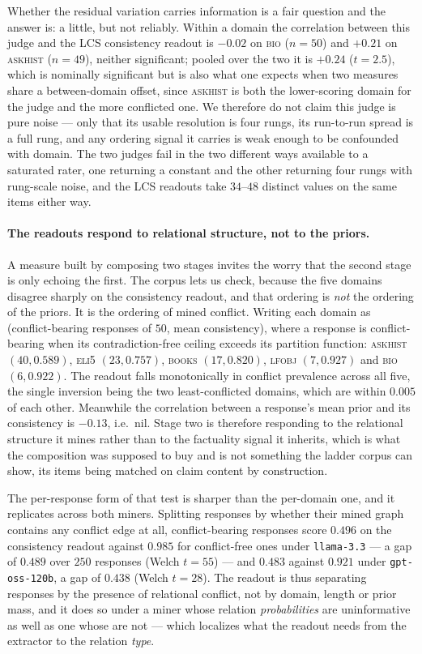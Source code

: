 Whether the residual variation carries information is a fair question and the answer is: a little, but
not reliably. Within a domain the correlation between this judge and the LCS consistency readout is
$-0.02$ on \textsc{bio} ($n = 50$) and $+0.21$ on \textsc{askhist} ($n = 49$), neither significant;
pooled over the two it is $+0.24$ ($t = 2.5$), which is nominally significant but is also what one
expects when two measures share a between-domain offset, since \textsc{askhist} is both the
lower-scoring domain for the judge and the more conflicted one. We therefore do not claim this judge is
pure noise --- only that its usable resolution is four rungs, its run-to-run spread is a full rung, and
any ordering signal it carries is weak enough to be confounded with domain. The two judges fail in the
two different ways available to a saturated rater, one returning a constant and the other returning
four rungs with rung-scale noise, and the LCS readouts take $34$--$48$ distinct values on the same items
either way.

\paragraph{The readouts respond to relational structure, not to the priors.} A measure built by
composing two stages invites the worry that the second stage is only echoing the first. The corpus lets
us check, because the five domains disagree sharply on the consistency readout, and that ordering is
\emph{not} the ordering of the priors. It is the ordering of mined conflict. Writing each domain as
(conflict-bearing responses of $50$, mean consistency), where a response is conflict-bearing when its
contradiction-free ceiling exceeds its partition function: \textsc{askhist} $(40, 0.589)$,
\textsc{eli5} $(23, 0.757)$, \textsc{books} $(17, 0.820)$, \textsc{lfobj} $(7, 0.927)$ and \textsc{bio}
$(6, 0.922)$. The readout falls monotonically in conflict prevalence across all five, the single
inversion being the two least-conflicted domains, which are within $0.005$ of each other. Meanwhile the
correlation between a response's mean prior and its consistency is $-0.13$, i.e.\ nil. Stage two is therefore responding to the
relational structure it mines rather than to the factuality signal it inherits, which is what the
composition was supposed to buy and is not something the ladder corpus can show, its items being
matched on claim content by construction.

The per-response form of that test is sharper than the per-domain one, and it replicates across both
miners. Splitting responses by whether their mined graph contains any conflict edge at all,
conflict-bearing responses score $0.496$ on the consistency readout against $0.985$ for conflict-free
ones under \texttt{llama-3.3} --- a gap of $0.489$ over $250$ responses (Welch $t = 55$) --- and $0.483$
against $0.921$ under \texttt{gpt-oss-120b}, a gap of $0.438$ (Welch $t = 28$). The readout is thus
separating responses by the presence of relational conflict, not by domain, length or prior mass, and it
does so under a miner whose relation \emph{probabilities} are uninformative as well as one whose are
not --- which localizes what the readout needs from the extractor to the relation \emph{type}.

